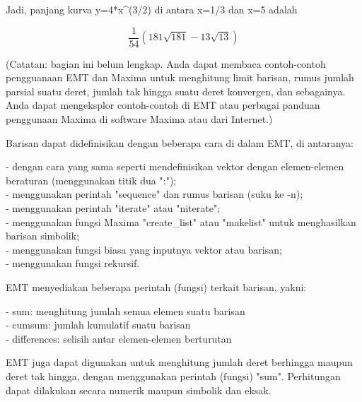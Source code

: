 \documentclass{article}
\begin{document}
\begin{eulernotebook}
\begin{eulercomment}
\begin{eulercomment}
\begin{eulerformula}
\[\]
\end{eulerformula}
\begin{eulercomment}
Jadi, panjang kurva y=4*x\textasciicircum{}(3/2) di antara x=1/3 dan x=5 adalah\\
\end{eulercomment}
\begin{eulerformula}
\[
\frac{1}{54}(181\sqrt{181}-13\sqrt{13})
\]
\end{eulerformula}
\begin{eulercomment}
(Catatan: bagian ini belum lengkap. Anda dapat membaca contoh-contoh pengguanaan EMT dan
Maxima untuk menghitung limit barisan, rumus jumlah parsial suatu deret, jumlah tak hingga
suatu deret konvergen, dan sebagainya. Anda dapat mengeksplor contoh-contoh di EMT atau
perbagai panduan penggunaan Maxima di software Maxima atau dari Internet.)

Barisan dapat didefinisikan dengan beberapa cara di dalam EMT, di antaranya:

- dengan cara yang sama seperti mendefinisikan vektor dengan elemen-elemen beraturan
(menggunakan titik dua ":");\\
- menggunakan perintah "sequence" dan rumus barisan (suku ke -n);\\
- menggunakan perintah "iterate" atau "niterate";\\
- menggunakan fungsi Maxima "create\_list" atau "makelist" untuk menghasilkan barisan
simbolik;\\
- menggunakan fungsi biasa yang inputnya vektor atau barisan;\\
- menggunakan fungsi rekursif.

EMT menyediakan beberapa perintah (fungsi) terkait barisan, yakni:

- sum: menghitung jumlah semua elemen suatu barisan\\
- cumsum: jumlah kumulatif suatu barisan\\
- differences: selisih antar elemen-elemen berturutan

EMT juga dapat digunakan untuk menghitung jumlah deret berhingga maupun deret tak hingga,
dengan menggunakan perintah (fungsi) "sum". Perhitungan dapat dilakukan secara numerik
maupun simbolik dan eksak.


\end{eulercomment}
\end{eulercomment}
\end{eulercomment}
\end{eulernotebook}
\end{document}
